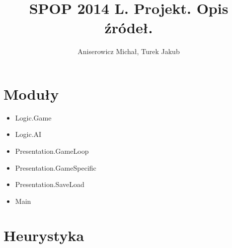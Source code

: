 \documentclass[a4paper,12pt]{article}
\title{SPOP 2014 L. Projekt. Opis źródeł.}
\author{Aniserowicz Michał, Turek Jakub}
\date{}
\begin{document}
\maketitle

\section{Moduły}

\begin{itemize}
 \item Logic.Game
 \item Logic.AI
 \item Presentation.GameLoop
 \item Presentation.GameSpecific
 \item Presentation.SaveLoad
 \item Main
\end{itemize}


\section{Heurystyka}
\end{document}
